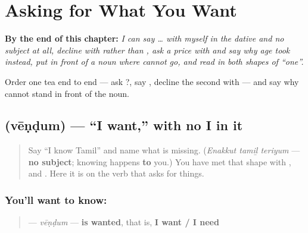 
\chapter{Asking for What You Want}
\label{ch:ta-asking-for-what-you-want}

\begin{chapteropening}
\textbf{By the end of this chapter:} \emph{I can say  …  with myself in the dative and no subject at all, decline with  rather than , ask a price with  and say why age took  instead, put  in front of a noun where  cannot go, and read  in both shapes of \textquotedblleft{}one\textquotedblright{}.}

Order one tea end to end — ask  ?, say   , decline the second with  — and say why  cannot stand in front of the noun.
\end{chapteropening}

\section[\texorpdfstring{\ta{வேண்டும்} (vēṇḍum)}{வேண்டும் (vēṇḍum)}]{ (vēṇḍum) — \textquotedblleft{}I want,\textquotedblright{} with no I in it}

\label{lesson:TA-C39-vendum}



\begin{quote}
Say \textquotedblleft{}I know Tamil\textquotedblright{} and name what is missing. (\emph{Enakkut tamiḻ teriyum} — \textbf{no subject}; knowing happens \textbf{to} you.) You have met that shape with \textbf{}, \textbf{} and \textbf{}. Here it is on the verb that asks for things.
\end{quote}

\subsection*{You'll want to know: }
\begin{quote}
\textbf{} — \emph{vēṇḍum} — \textbf{is wanted}, that is, \textbf{I want / I need}
\end{quote}

